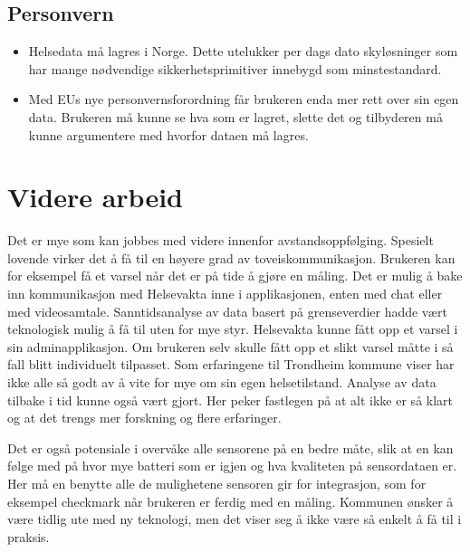 \subsection{Personvern}

\begin{itemize}
  \item Helsedata må lagres i Norge. Dette utelukker per dags dato skyløsninger
  som har mange nødvendige sikkerhetsprimitiver innebygd som minstestandard.
  \item Med EUs nye personvernsforordning får brukeren enda mer rett over sin egen data.
  Brukeren må kunne se hva som er lagret, slette det og tilbyderen må kunne argumentere
  med hvorfor dataen må lagres.
\end{itemize}


\section{Videre arbeid}
Det er mye som kan jobbes med videre innenfor avstandsoppfølging. Spesielt lovende virker det å få til
en høyere grad av toveiskommunikasjon. Brukeren kan for eksempel få et varsel når det er på tide å gjøre en måling.
Det er mulig å bake inn kommunikasjon med Helsevakta inne i applikasjonen, enten med chat eller med videosamtale.
Sanntidsanalyse av data basert på grenseverdier hadde vært teknologisk mulig å få til uten for mye styr. Helsevakta
kunne fått opp et varsel i sin adminapplikasjon. Om brukeren selv skulle fått opp et slikt varsel måtte i så fall blitt
individuelt tilpasset. Som erfaringene til Trondheim kommune viser har ikke alle så godt av å vite for mye om sin egen
helsetilstand. Analyse av data tilbake i tid kunne også vært gjort. Her peker fastlegen på at alt ikke er så klart og
at det trengs mer forskning og flere erfaringer.

Det er også potensiale i overvåke alle sensorene på en bedre måte, slik at en kan følge med på hvor mye batteri som er igjen
og hva kvaliteten på sensordataen er. Her må en benytte alle de mulighetene sensoren gir for integrasjon, som for eksempel
checkmark når brukeren er ferdig med en måling. Kommunen ønsker å være tidlig ute med
ny teknologi, men det viser seg å ikke være så enkelt å få til i praksis.
